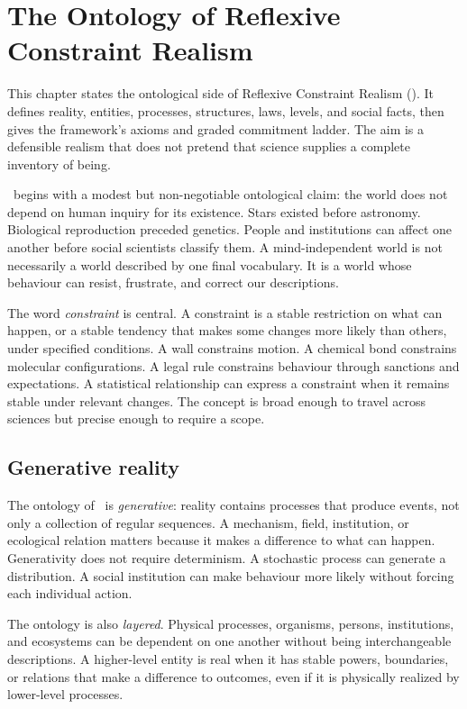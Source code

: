 \chapter{The Ontology of Reflexive Constraint Realism}
\label{ch:ontology}

\begin{chapterguide}
This chapter states the ontological side of Reflexive Constraint Realism
(\RCR). It defines reality, entities, processes, structures, laws, levels, and
social facts, then gives the framework's axioms and graded commitment ladder.
The aim is a defensible realism that does not pretend that science supplies a
complete inventory of being.
\end{chapterguide}

\RCR\ begins with a modest but non-negotiable ontological claim: the world does
not depend on human inquiry for its existence. Stars existed before astronomy.
Biological reproduction preceded genetics. People and institutions can affect
one another before social scientists classify them. A mind-independent world is
not necessarily a world described by one final vocabulary. It is a world whose
behaviour can resist, frustrate, and correct our descriptions.

The word \emph{constraint} is central. A constraint is a
stable restriction on what can happen, or a stable tendency that makes some
changes more likely than others, under specified conditions. A wall constrains
motion. A chemical bond constrains molecular configurations. A legal rule
constrains behaviour through sanctions and expectations. A statistical
relationship can express a constraint when it remains stable under relevant
changes. The concept is broad enough to travel across sciences but precise
enough to require a scope.

\section{Generative reality}

The ontology of \RCR\ is \emph{generative}: reality contains processes that
produce events, not only a collection of regular sequences. A mechanism, field,
institution, or ecological relation matters because it makes a difference to
what can happen. Generativity does not require determinism. A stochastic
process can generate a distribution. A social institution can make behaviour
more likely without forcing each individual action.

The ontology is also \emph{layered}. Physical processes, organisms, persons,
institutions, and ecosystems can be dependent on one another without being
interchangeable descriptions. A higher-level entity is real when it has
stable powers, boundaries, or relations that make a difference to outcomes,
even if it is physically realized by lower-level processes.


